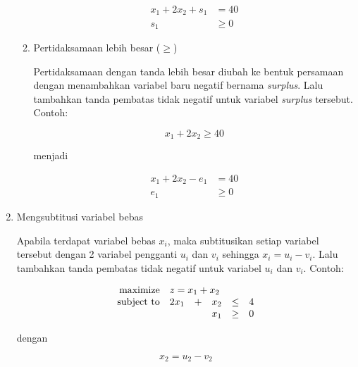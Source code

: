 \begin{enumerate}
\begin{enumerate}
				\begin{equation*}
					\begin{split}
						x_1 + 2x_2 + s_1 &= 40\\
						s_1 &\geq 0
					\end{split}
				\end{equation*}
			
			\item Pertidaksamaan lebih besar (\(\geq\))
			
				Pertidaksamaan dengan tanda lebih besar diubah ke bentuk persamaan dengan menambahkan variabel baru negatif bernama \textit{surplus}. Lalu tambahkan tanda pembatas tidak negatif untuk variabel \textit{surplus} tersebut. Contoh:
				
				\begin{equation*}
					x_1 + 2x_2 \geq 40
				\end{equation*}
				
				menjadi
				
				\begin{equation*}
					\begin{split}
						x_1 + 2x_2 - e_1 &= 40\\
						e_1 &\geq 0
					\end{split}
				\end{equation*}
		\end{enumerate}
		
	\item Mengsubtitusi variabel bebas
	
		Apabila terdapat variabel bebas \(x_i\), maka subtitusikan setiap variabel tersebut dengan 2 variabel pengganti \(u_i\) dan \(v_i\) sehingga \(x_i = u_i - v_i\). Lalu tambahkan tanda pembatas tidak negatif untuk variabel \(u_i\) dan \(v_i\). Contoh:
		
		\begin{equation*}
			\begin{array}{r r c r c l}
				\text{maximize} & \multicolumn{5}{l}{z = x_1 + x_2}\\
				\text{subject to} & 2x_1 & + & x_2 & \leq & 4\\
									& \multicolumn{3}{r}{x_1} & \geq & 0\\
			\end{array}
		\end{equation*}
		
		dengan
		
		\begin{equation*}
			x_2 = u_2 - v_2
		\end{equation*}
		

\end{enumerate}
